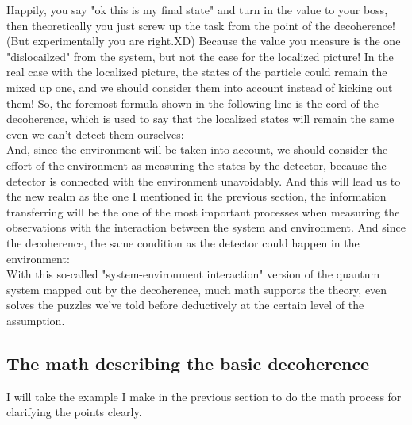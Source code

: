 \documentclass[final,1p,12pt]{elsarticle}
\begin{document}
Happily, you say "ok this is my final state" and turn in the value to your boss, then theoretically you just screw up the task from the point of the decoherence! (But experimentally you are right.XD) Because the value you measure is the one "dislocailzed" from the system, but not the case for the localized picture! In the real case with the localized picture, the states of the particle could remain the mixed up one, and we should consider them into account instead of kicking out them!  So, the foremost formula shown in the following line is the cord of the decoherence, which is used to say that the localized states will remain the same even we can't detect them ourselves:\\

And, since the environment will be taken into account, we should consider the effort of the environment as measuring the states by the detector, because the detector is connected with the environment unavoidably. And this will lead us to the new realm as the one I mentioned in the previous section, the information transferring will be the one of the most important processes when measuring the observations with the interaction between the system and environment. And since the decoherence, the same condition as the detector could happen in the environment:\\

With this so-called "system-environment interaction" version of the quantum system mapped out by the decoherence, much math supports the theory, even solves the puzzles we've told before deductively at the certain level of the assumption. 

\subsection{The math describing the basic decoherence}
I will take the example I make in the previous section to do the math process for clarifying the points clearly.\\
\end{document}
